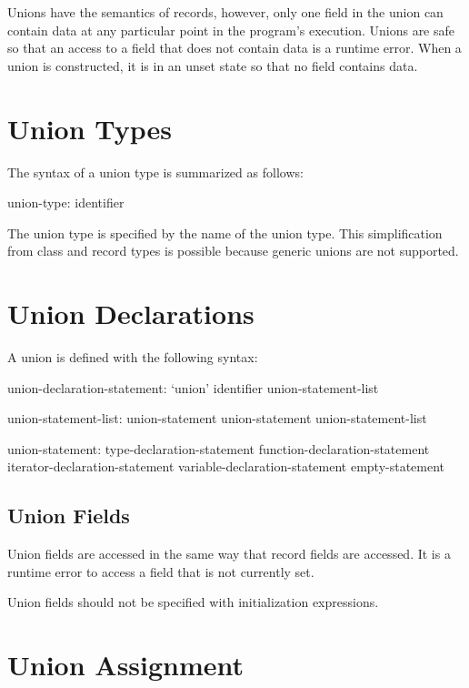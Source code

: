 \label{Unions}

Unions have the semantics of records, however, only one field in the
union can contain data at any particular point in the program's
execution.  Unions are safe so that an access to a field that does not
contain data is a runtime error.  When a union is constructed, it is
in an unset state so that no field contains data.

\section{Union Types}
\label{Union_Types}

The syntax of a union type is summarized as follows:
\begin{syntax}
union-type:
  identifier
\end{syntax}
The union type is specified by the name of the union type.  This
simplification from class and record types is possible because generic
unions are not supported.

\section{Union Declarations}
\label{Union_Declarations}

A union is defined with the following syntax:
\begin{syntax}
union-declaration-statement:
  `union' identifier { union-statement-list }

union-statement-list:
  union-statement
  union-statement union-statement-list

union-statement:
  type-declaration-statement
  function-declaration-statement
  iterator-declaration-statement
  variable-declaration-statement
  empty-statement
\end{syntax}

\subsection{Union Fields}
\label{Union_Fields}

Union fields are accessed in the same way that record fields are
accessed.  It is a runtime error to access a field that is not
currently set.

Union fields should not be specified with initialization expressions.

\section{Union Assignment}
\label{Union_Assignment}

